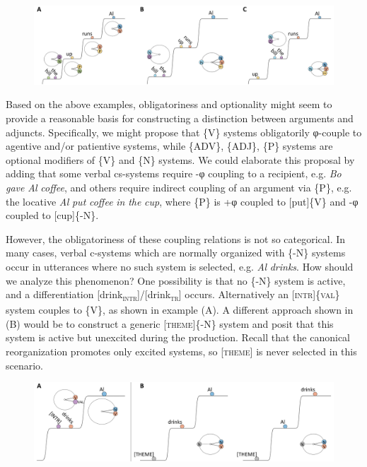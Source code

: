   
\begin{figure}
\includegraphics[width=\textwidth]{figures/Tilsen-img85.png}
\caption{\missingcaption}
\label{fig:}
\end{figure}
 

  Based on the above examples, obligatoriness and optionality might seem to provide a reasonable basis for constructing a distinction between arguments and adjuncts. Specifically, we might propose that \{V\} systems obligatorily φ-couple to agentive and/or patientive systems, while \{ADV\}, \{ADJ\}, \{P\} systems are optional modifiers of \{V\} and \{N\} systems. We could elaborate this proposal by adding that some verbal cs-systems require -φ coupling to a recipient, e.g. \textit{Bo} \textit{gave} \textit{Al} \textit{coffee}, and others require indirect coupling of an argument via \{P\}, e.g. the locative \textit{Al} \textit{put} \textit{coffee} \textit{in} \textit{the} \textit{cup}, where \{P\} is +φ coupled to [put]\{V\} and -φ coupled to [cup]\{-N\}.

  However, the obligatoriness of these coupling relations is not so categorical. In many cases, verbal c-systems which are normally organized with \{-N\} systems occur in utterances where no such system is selected, e.g. \textit{Al} \textit{drinks}. How should we analyze this phenomenon? One possibility is that no \{-N\} system is active, and a differentiation [drink\textsc{\textsubscript{intr}}]/[drink\textsc{\textsubscript{tr}}] occurs. Alternatively an [\textsc{intr}]\{\textsc{val}\} system couples to \{V\}, as shown in example (A). A different approach shown in (B) would be to construct a generic [\textsc{theme}]\{-N\} system and posit that this system is active but unexcited during the production. Recall that the canonical reorganization promotes only excited systems, so [\textsc{theme}] is never selected in this scenario. 

  
\begin{figure}
\includegraphics[width=\textwidth]{figures/Tilsen-img86.png}
\caption{\missingcaption}
\label{fig:}
\end{figure}
 

